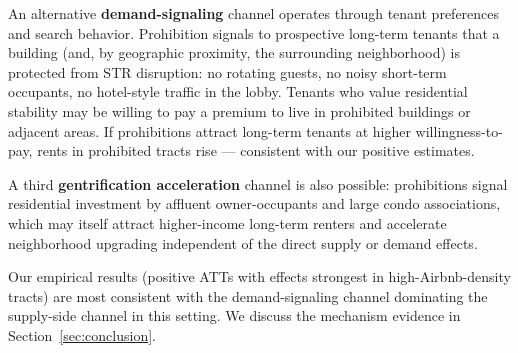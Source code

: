 An alternative \textbf{demand-signaling} channel operates through tenant preferences and search behavior. Prohibition signals to prospective long-term tenants that a building (and, by geographic proximity, the surrounding neighborhood) is protected from STR disruption: no rotating guests, no noisy short-term occupants, no hotel-style traffic in the lobby. Tenants who value residential stability may be willing to pay a premium to live in prohibited buildings or adjacent areas. If prohibitions attract long-term tenants at higher willingness-to-pay, rents in prohibited tracts rise --- consistent with our positive estimates.

A third \textbf{gentrification acceleration} channel is also possible: prohibitions signal residential investment by affluent owner-occupants and large condo associations, which may itself attract higher-income long-term renters and accelerate neighborhood upgrading independent of the direct supply or demand effects.

Our empirical results (positive ATTs with effects strongest in high-Airbnb-density tracts) are most consistent with the demand-signaling channel dominating the supply-side channel in this setting. We discuss the mechanism evidence in Section~\ref{sec:conclusion}.
